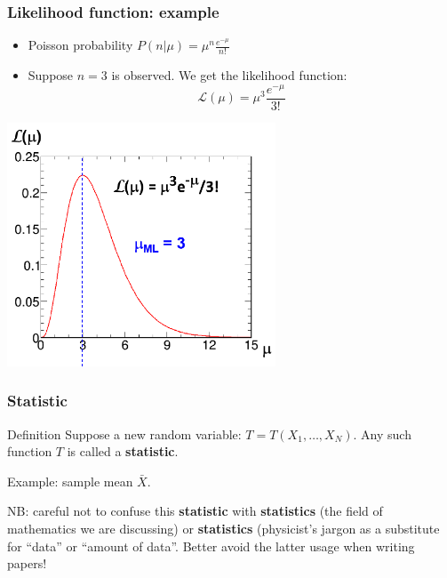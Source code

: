 \documentclass[9pt]{beamer}
\begin{document}
\begin{frame}
 \frametitle{Likelihood function: example}
 
 \begin{itemize}
  \item Poisson probability $P(n|\mu) = \mu^n \frac{e^{-\mu}}{n!}$
  \item Suppose $n=3$ is observed. We get the likelihood function:
  $$\mathcal{L}(\mu) = \mu^3 \frac{e^{-\mu}}{3!}$$
 \end{itemize}
 
 \begin{center}
  \includegraphics[width=0.6\textwidth]{likelihood_Poisson.png}
 \end{center}


\end{frame}


\begin{frame}
 \frametitle{Statistic}
 
 \begin{block}{Definition}
  Suppose a new random variable: $T = T(X_1,\dots,X_N)$. Any such function $T$ is called a \textbf{statistic}.
 \end{block}
 
 Example: sample mean $\bar{X}$.
 
 \vspace{10pt}
 
 NB: careful not to confuse this \textbf{statistic} with \textbf{statistics} (the field of mathematics we are discussing) or \textbf{statistics} (physicist's jargon as a substitute for
 ``data'' or ``amount of data''. Better avoid the latter usage when writing papers!

\end{frame}
\end{document}
